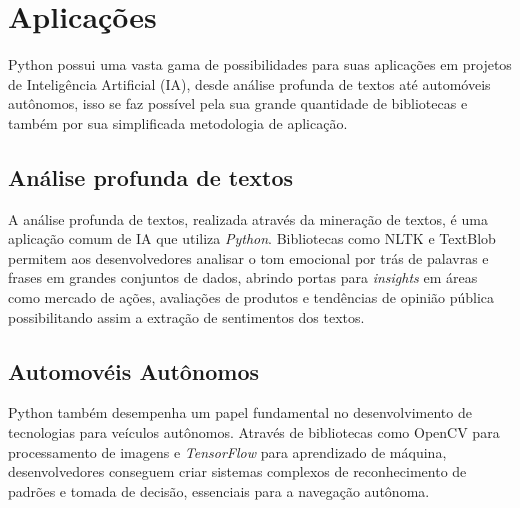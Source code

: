 \section{Aplicações}

Python possui uma vasta gama de possibilidades para suas aplicações em projetos de Inteligência Artificial (IA), desde análise profunda de textos até automóveis autônomos, isso se faz possível pela sua grande quantidade de bibliotecas e também por sua simplificada metodologia de aplicação.\cite{didatica2024}

\subsection{Análise profunda de textos}

A análise profunda de textos, realizada através da mineração de textos, é uma aplicação comum de IA que utiliza \textit{Python}. Bibliotecas como NLTK e TextBlob permitem aos desenvolvedores analisar o tom emocional por trás de palavras e frases em grandes conjuntos de dados, abrindo portas para \textit{insights} em áreas como mercado de ações, avaliações de produtos e tendências de opinião pública possibilitando assim a extração de sentimentos dos textos.\cite{didatica2024}

\subsection{Automovéis Autônomos}

Python também desempenha um papel fundamental no desenvolvimento de tecnologias para veículos autônomos. Através de bibliotecas como OpenCV para processamento de imagens e \textit{TensorFlow} para aprendizado de máquina, desenvolvedores conseguem criar sistemas complexos de reconhecimento de padrões e tomada de decisão, essenciais para a navegação autônoma.\cite{didatica2024}